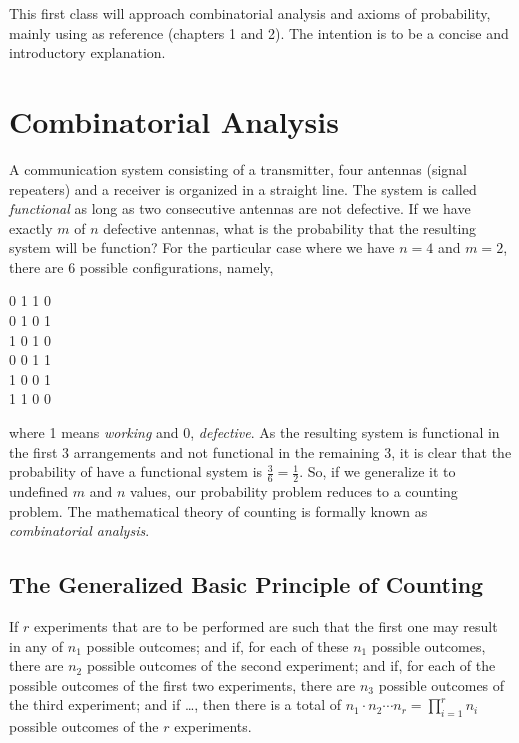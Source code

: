 \documentclass[a4paper,twocolumn]{article}
\begin{document}
This first class will approach combinatorial analysis and axioms of probability, mainly using \cite{ross} as reference (chapters 1 and 2). The intention is to be a concise and introductory explanation.


\section{Combinatorial Analysis}

A communication system consisting of a transmitter, four antennas (signal repeaters) and a receiver is organized in a straight line. The system is called \textit{functional} as long as two consecutive antennas are not defective. If we have exactly $m$ of $n$ defective antennas, what is the probability that the resulting system will be function? For the particular case where we have $n = 4$ and $m = 2$, there are 6 possible configurations, namely,

\begin{center}
0 1 1 0\\
0 1 0 1\\
1 0 1 0\\
0 0 1 1\\
1 0 0 1\\
1 1 0 0
\end{center}

\noindent where 1 means \textit{working} and 0, \textit{defective}. As the resulting system is functional in the first 3 arrangements and not functional in the remaining 3, it is clear that the probability of have a functional system is $\frac{3}{6} = \frac{1}{2}$. So, if we generalize it to undefined $m$ and $n$ values, our probability problem reduces to a counting problem. The mathematical theory of counting is formally known as \textit{combinatorial analysis}.


\subsection{The Generalized Basic Principle of Counting}

If $r$ experiments that are to be performed are such that the first one may result in any of $n_1$ possible outcomes; and if, for each of these $n_1$ possible outcomes, there are $n_2$ possible outcomes of the second experiment; and if, for each of the possible outcomes of the first two experiments, there are $n_3$ possible outcomes of the third experiment; and if \dots , then there is a total of $n_1 \cdot n_2 \dotsm n_r = \prod_{i=1}^{r} n_i$ possible outcomes of the $r$ experiments.\\
\end{document}
